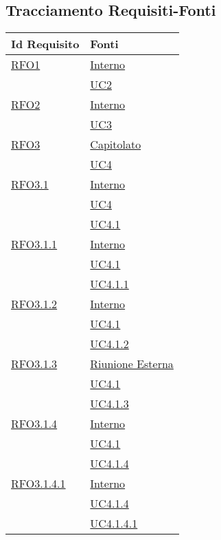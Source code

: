 \subsection{Tracciamento Requisiti-Fonti}
\normalsize
\begin{longtable}{|>{\centering}m{5cm}|m{5cm}<{\centering}|}
\hline 
\textbf{Id Requisito} & \textbf{Fonti}\\
\hline
\endhead
\hyperlink{RFO1}{RFO1} & \hyperlink{Interno}{Interno}\\
& \hyperref[UC2]{UC2}\\ \hline

\hyperlink{RFO2}{RFO2} & \hyperlink{Interno}{Interno}\\
& \hyperref[UC3]{UC3}\\ \hline

\hyperlink{RFO3}{RFO3} & \hyperlink{Capitolato}{Capitolato}\\
& \hyperref[UC4]{UC4}\\ \hline

\hyperlink{RFO3.1}{RFO3.1} & \hyperlink{Interno}{Interno}\\
& \hyperref[UC4]{UC4}\\
& \hyperref[UC4.1]{UC4.1}\\ \hline

\hyperlink{RFO3.1.1}{RFO3.1.1} & \hyperlink{Interno}{Interno}\\
& \hyperref[UC4.1]{UC4.1}\\
& \hyperref[UC4.1.1]{UC4.1.1}\\ \hline

\hyperlink{RFO3.1.2}{RFO3.1.2} & \hyperlink{Interno}{Interno}\\
& \hyperref[UC4.1]{UC4.1}\\
& \hyperref[UC4.1.2]{UC4.1.2}\\ \hline

\hyperlink{RFO3.1.3}{RFO3.1.3} & \hyperlink{Riunione Esterna}{Riunione Esterna}\\
& \hyperref[UC4.1]{UC4.1}\\
& \hyperref[UC4.1.3]{UC4.1.3}\\ \hline

\hyperlink{RFO3.1.4}{RFO3.1.4} & \hyperlink{Interno}{Interno}\\
& \hyperref[UC4.1]{UC4.1}\\
& \hyperref[UC4.1.4]{UC4.1.4}\\ \hline

\hyperlink{RFO3.1.4.1}{RFO3.1.4.1} & \hyperlink{Interno}{Interno}\\
& \hyperref[UC4.1.4]{UC4.1.4}\\
& \hyperref[UC4.1.4.1]{UC4.1.4.1}\\ \hline


\end{longtable}
